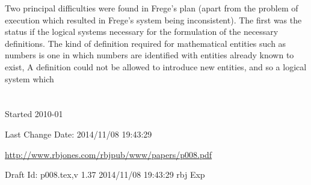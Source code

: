 \documentclass[10pt,titlepage]{book}
\begin{document}
Two principal difficulties were found in Frege's plan (apart from the problem of execution which resulted in Frege's system being inconsistent).
The first was the status if the logical systems necessary for the formulation of the necessary definitions.
The kind of definition required for mathematical entities such as numbers is one in which numbers are identified with entities already known to exist,
A definition could not be allowed to introduce new entities, and so a logical system which 






\chapter{}

\backmatter

%




\label{index}
{\twocolumn[]
{\small\printindex}}

\vfill

\tiny{
Started 2010-01

Last Change $ $Date: 2014/11/08 19:43:29 $ $

\href{http://www.rbjones.com/rbjpub/www/papers/p008.pdf}{http://www.rbjones.com/rbjpub/www/papers/p008.pdf}

Draft $ $Id: p008.tex,v 1.37 2014/11/08 19:43:29 rbj Exp $ $
}%
\end{document}
